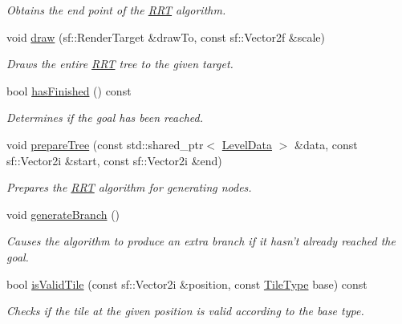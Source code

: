 \begin{DoxyCompactItemize}
\begin{DoxyCompactList}\small\item\em Obtains the end point of the \hyperlink{classRRT}{R\+R\+T} algorithm. \end{DoxyCompactList}\item 
void \hyperlink{classRRT_ace95930cd4860fc4afb9ccc329e1f010}{draw} (sf\+::\+Render\+Target \&draw\+To, const sf\+::\+Vector2f \&scale)
\begin{DoxyCompactList}\small\item\em Draws the entire \hyperlink{classRRT}{R\+R\+T} tree to the given target. \end{DoxyCompactList}\item 
bool \hyperlink{classRRT_a9b27ef76b0e43d8ff3f10ed9db287c35}{has\+Finished} () const 
\begin{DoxyCompactList}\small\item\em Determines if the goal has been reached. \end{DoxyCompactList}\item 
void \hyperlink{classRRT_ab874a1061b18086df06ac1e4dc91b27d}{prepare\+Tree} (const std\+::shared\+\_\+ptr$<$ \hyperlink{classLevelData}{Level\+Data} $>$ \&data, const sf\+::\+Vector2i \&start, const sf\+::\+Vector2i \&end)
\begin{DoxyCompactList}\small\item\em Prepares the \hyperlink{classRRT}{R\+R\+T} algorithm for generating nodes. \end{DoxyCompactList}\item 
void \hyperlink{classRRT_ad906dded9e6d3bb3f1f1f5972cd3fdf7}{generate\+Branch} ()
\begin{DoxyCompactList}\small\item\em Causes the algorithm to produce an extra branch if it hasn't already reached the goal. \end{DoxyCompactList}\item 
bool \hyperlink{classRRT_ac87ec16ecb94d25a9941b29c75dc83fa}{is\+Valid\+Tile} (const sf\+::\+Vector2i \&position, const \hyperlink{LevelData_8hpp_a47dee72188473c57343127b1a5843398}{Tile\+Type} base) const 
\begin{DoxyCompactList}\small\item\em Checks if the tile at the given position is valid according to the base type. \end{DoxyCompactList}\end{DoxyCompactItemize}
